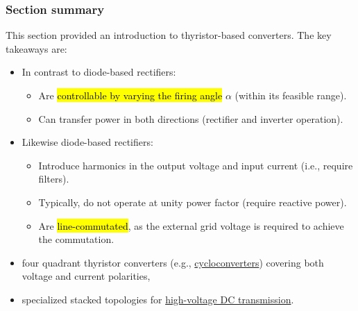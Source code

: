 \begin{frame}
    \frametitle{Section summary}
    This section provided an introduction to thyristor-based converters. The key takeaways are:
    \begin{itemize}
        \item<2-> In contrast to diode-based rectifiers:
        \begin{itemize}
            \item<2-> Are \hl{controllable by varying the firing angle} $\alpha$ (within its feasible range).
            \item<3-> Can transfer power in both directions (rectifier and inverter operation).
        \end{itemize}
        \item<4-> Likewise diode-based rectifiers:
        \begin{itemize}
            \item<4-> Introduce harmonics in the output voltage and input current (i.e., require filters).
            \item<5-> Typically, do not operate at unity power factor (require reactive power).
            \item<6-> Are \hl{line-commutated}, as the external grid voltage is required to achieve the commutation.
        \end{itemize}
    \end{itemize}
    \begin{itemize}
        \item<8-> four quadrant thyristor converters (e.g., \href{https://en.wikipedia.org/wiki/Cycloconverter}{cycloconverters}) covering both voltage and current polarities,
        \item<9-> specialized stacked topologies for \href{https://en.wikipedia.org/wiki/High-voltage_direct_current}{high-voltage DC transmission}.
    \end{itemize}
\end{frame}